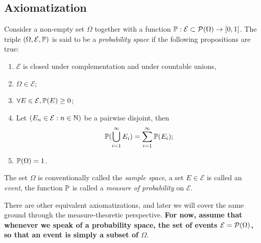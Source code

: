 \subsection{Axiomatization}

\begin{definition}
   Consider a non-empty set $\Omega$ together with a function $\mathbb{P} : \mathcal{E} \subset \mathcal{P}(\Omega) \to [0,1]$. The triple $(\Omega, \mathcal{E}, \mathbb{P})$ is said to be a \emph{probability space} if the following propositions are true:
   \begin{enumerate}
        \item $\mathcal{E}$ is closed under complementation and under countable unions,
        \item $\Omega \in \mathcal{E}$;
        \item $\forall E \in \mathcal{E}, \mathbb{P}(E) \geq 0$;
        \item Let $(E_n \in \mathcal{E}: n \in \mathbb{N})$ be a pairwise disjoint, then 
        \begin{equation*}
           \mathbb{P}(\bigcup_{i=1}^\infty E_i) = \sum_{i=1}^\infty \mathbb{P}(E_i);
       \end{equation*} 
       \item $\mathbb{P}(\Omega) = 1$.
   \end{enumerate}
   The set $\Omega$ is conventionally called the \emph{sample space}, a set $E \in \mathcal{E}$ is called an \emph{event}, the function $\mathbb{P}$ is called a \emph{measure of probability} on $\mathcal{E}$.
\end{definition}

\begin{remark}
    There are other equivalent axiomatizations, and later we will cover the same ground through the measure-theoretic perspective.
    \textbf{For now, assume that whenever we speak of a probability space, the set of events $\mathcal{E} = \mathcal{P}(\Omega)$, so that an event is simply a subset of $\Omega$}.
\end{remark}

